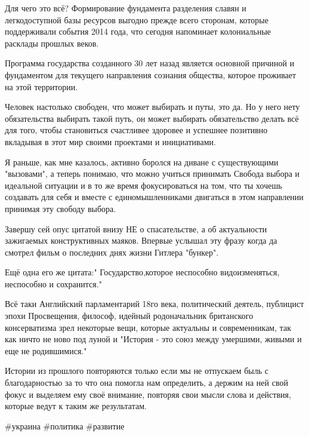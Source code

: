 Для чего это всё? Формирование фундамента разделения славян и легкодоступной
базы ресурсов выгодно прежде всего сторонам, которые поддерживали события 2014
года, что сегодня напоминает колониальные расклады прошлых веков.

Программа государства созданного 30 лет назад является основной причиной и
фундаментом для текущего направления сознания общества, которое проживает на
этой территории.

Человек настолько свободен, что может выбирать и путы, это да. Но у него нету
обязательства выбирать такой путь, он может выбирать обязательство делать всё
для того, чтобы становиться счастливее здоровее и успешнее позитивно вкладывая
в этот мир своими проектами и инициативами. 

Я раньше, как мне казалось, активно боролся на диване с существующими
"вызовами", а теперь понимаю, что можно учиться принимать Свобода выбора и
идеальной ситуации и в то же время фокусироваться на том, что ты хочешь
создавать для себя и вместе с единомышленниками двигаться в этом направлении
принимая эту свободу выбора.

Завершу сей опус цитатой внизу НЕ о спасательстве, а об актуальности зажигаемых
конструктивных маяков. Впервые услышал эту фразу когда да смотрел фильм о
последних днях жизни Гитлера "бункер".

Ещё одна его же цитата:" Государство,которое неспособно видоизменяться,
неспособно и сохранится." 

Всё таки Английский парламентарий 18го века, политический деятель, публицист
эпохи Просвещения, философ, идейный родоначальник британского консерватизма
зрел некоторые вещи, которые актуальны и современникам, так как ничто не ново
под луной и "История - это союз между умершими, живыми и еще не родившимися." 

Истории из прошлого повторяются только если мы не отпускаем быль с
благодарностью за то что она помогла нам определить, а держим на ней свой фокус
и выделяем ему своё внимание, повторяя свои мысли слова и действия, которые
ведут к таким же результатам.

\#украина \#политика \#развитие
